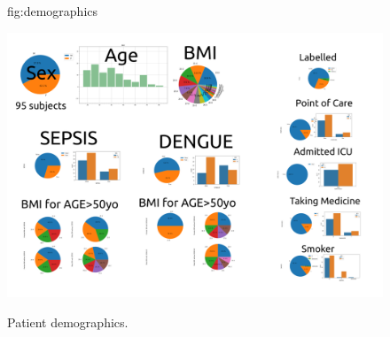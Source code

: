 \documentclass[mlabstract,twocolumn]{jmlr}
\begin{document}
\begin{figure}[htbp]
\floatconts
  {fig:demographics}
  {\caption{Patient demographics.}} %
  {\includegraphics[width=\columnwidth]{../figures/patient-demographics-and-diseases/versions/drawing-v00}}%
\end{figure}
\end{document}
